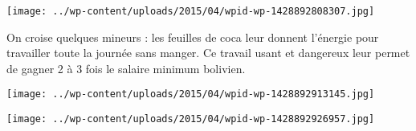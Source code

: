 \centerline{\texttt{[image: ../wp-content/uploads/2015/04/wpid-wp-1428892808307.jpg]} } 
 \newline
 On croise quelques mineurs : les feuilles de coca leur donnent l'énergie pour travailler toute la journée sans manger. \newline
 Ce travail usant et dangereux leur permet de gagner 2 à 3 fois le salaire minimum bolivien.  \newline
 \newline
\centerline{\texttt{[image: ../wp-content/uploads/2015/04/wpid-wp-1428892913145.jpg]} } 
 \newline
 \newline
\centerline{\texttt{[image: ../wp-content/uploads/2015/04/wpid-wp-1428892926957.jpg]} } 
 \newline

\newpage
 
